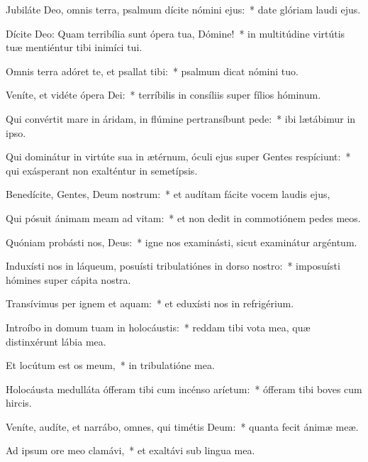 \item Jubiláte Deo, omnis terra, psalmum dícite nómini ejus:~* date glóriam laudi ejus.

\item Dícite Deo: Quam terribília sunt ópera tua, Dómine!~* in multitúdine virtútis tuæ mentiéntur tibi inimíci tui.

\item Omnis terra adóret te, et psallat tibi:~* psalmum dicat nómini tuo.

\item Veníte, et vidéte ópera Dei:~* terríbilis in consíliis super fílios hóminum.

\item Qui convértit mare in áridam, in flúmine pertransíbunt pede:~* ibi lætábimur in ipso.

\item Qui dominátur in virtúte sua in ætérnum, óculi ejus super Gentes respíciunt:~* qui exásperant non exalténtur in semetípsis.

\item Benedícite, Gentes, Deum nostrum:~* et audítam fácite vocem laudis ejus,

\item Qui pósuit ánimam meam ad vitam:~* et non dedit in commotiónem pedes meos.

\item Quóniam probásti nos, Deus:~* igne nos examinásti, sicut examinátur argéntum.

\item Induxísti nos in láqueum, posuísti tribulatiónes in dorso nostro:~* imposuísti hómines super cápita nostra.

\item Transívimus per ignem et aquam:~* et eduxísti nos in refrigérium.

\item Introíbo in domum tuam in holocáustis:~* reddam tibi vota mea, quæ distinxérunt lábia mea.

\item Et locútum est os meum,~* in tribulatióne mea.

\item Holocáusta medulláta ófferam tibi cum incénso aríetum:~* ófferam tibi boves cum hircis.

\item Veníte, audíte, et narrábo, omnes, qui timétis Deum:~* quanta fecit ánimæ meæ.

\item Ad ipsum ore meo clamávi,~* et exaltávi sub lingua mea.

